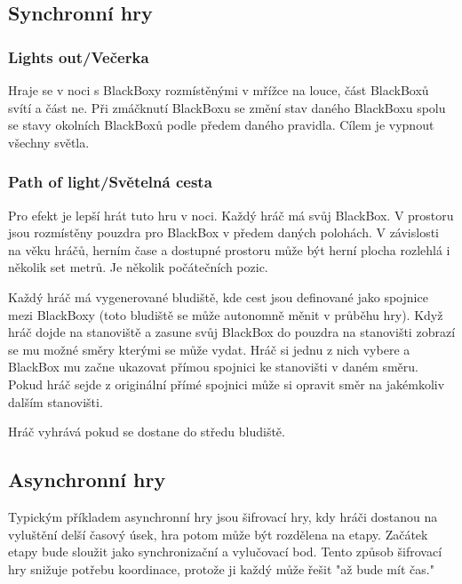 \subsection{Synchronní hry}

\subsubsection{Lights out/Večerka}

Hraje se v noci s BlackBoxy rozmístěnými v mřížce na louce, část BlackBoxů svítí a část ne.
Při zmáčknutí BlackBoxu se změní stav daného BlackBoxu spolu se stavy okolních BlackBoxů podle předem daného pravidla.
Cílem je vypnout všechny světla.

\subsubsection{Path of light/Světelná cesta}

Pro efekt je lepší hrát tuto hru v noci.
Každý hráč má svůj BlackBox.
V prostoru jsou rozmístěny pouzdra pro BlackBox v předem daných polohách.
V závislosti na věku hráčů, herním čase a dostupné prostoru může být herní plocha rozlehlá i několik set metrů.
Je několik počátečních pozic.

Každý hráč má vygenerované bludiště, kde cest jsou definované jako spojnice mezi BlackBoxy (toto bludiště se může autonomně měnit v průběhu hry).
Když hráč dojde na stanoviště a zasune svůj BlackBox do pouzdra na stanovišti zobrazí se mu možné směry kterými se může vydat.
Hráč si jednu z nich vybere a BlackBox mu začne ukazovat přímou spojnici ke stanovišti v daném směru.
Pokud hráč sejde z originální přímé spojnici může si opravit směr na jakémkoliv dalším stanovišti.

Hráč vyhrává pokud se dostane do středu bludiště.


\subsection{Asynchronní hry}

Typickým příkladem asynchronní hry jsou šifrovací hry, kdy hráči dostanou na vyluštění delší časový úsek, hra potom může být rozdělena na etapy.
Začátek etapy bude sloužit jako synchronizační a vylučovací bod.
Tento způsob šifrovací hry snižuje potřebu koordinace, protože ji každý může řešit "až bude mít čas."
